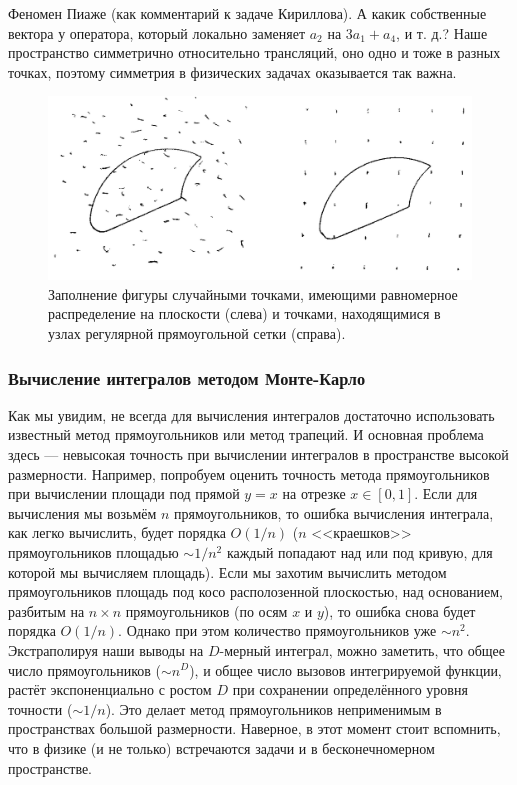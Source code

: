 \documentclass{book}
\begin{document}
Феномен Пиаже (как комментарий к задаче Кириллова). А какик собственные вектора у оператора,
который локально заменяет $a_2$ на $3 a_1 + a_4$, и т. д.? Наше пространство симметрично
относительно трансляций, оно одно и тоже в разных точках, поэтому симметрия в физических задачах
оказывается так важна.

\clearpage

\begin{figure}
	\includegraphics[width=1\linewidth]{dots-for-monte-carlo.png}
    \caption{\label{dots-for-monte-carlo}Заполнение фигуры случайными точками, имеющими равномерное
    распределение на плоскости (слева) и точками, находящимися в узлах регулярной прямоугольной
    сетки (справа).}
\end{figure}

\subsubsection{Вычисление интегралов методом Монте-Карло}

Как мы увидим, не всегда для вычисления интегралов достаточно использовать известный метод
прямоугольников или метод трапеций. И основная проблема здесь --- невысокая точность при вычислении
интегралов в пространстве высокой размерности. Например, попробуем оценить точность метода
прямоугольников при вычислении площади под прямой $y = x$ на отрезке $x \in [0, 1]$. Если для
вычисления мы возьмём $n$ прямоугольников, то ошибка вычисления интеграла, как легко вычислить,
будет порядка $O(1/n)$ ($n$ <<краешков>> прямоугольников площадью $\sim 1/n^2$ каждый попадают над
или под кривую, для которой мы вычисляем площадь). Если мы захотим вычислить методом
прямоугольников площадь под косо располозенной плоскостью, над основанием, разбитым на $n \times n$
прямоугольников (по осям $x$ и $y$), то ошибка снова будет порядка $O(1/n)$. Однако при этом
количество прямоугольников уже $\sim n^2$. Экстраполируя наши выводы на $D$-мерный интеграл, можно
заметить, что общее число прямоугольников ($\sim n^D$), и общее число вызовов интегрируемой
функции, растёт экспоненциально с ростом $D$ при сохранении определённого уровня точности ($\sim
1/n$). Это делает метод прямоугольников неприменимым в пространствах большой размерности. Наверное,
в этот момент стоит вспомнить, что в физике (и не только) встречаются задачи и в бесконечномерном
пространстве.
\end{document}
